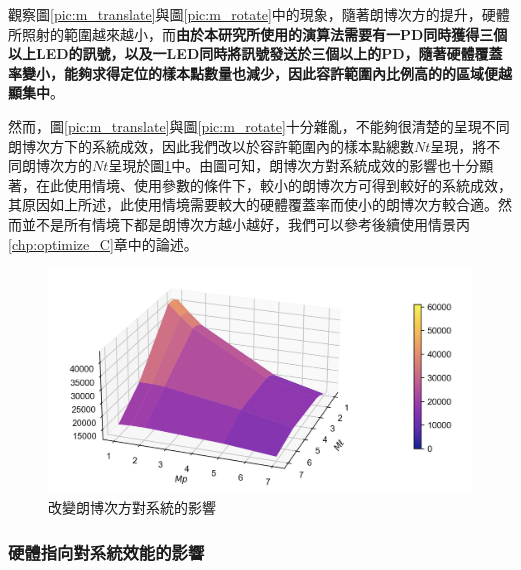 觀察圖\ref{pic:m_translate}與圖\ref{pic:m_rotate}中的現象，隨著朗博次方的提升，硬體所照射的範圍越來越小，而\textbf{由於本研究所使用的演算法需要有一PD同時獲得三個以上LED的訊號，以及一LED同時將訊號發送於三個以上的PD，隨著硬體覆蓋率變小，能夠求得定位的樣本點數量也減少，因此容許範圍內比例高的的區域便越顯集中}。



然而，圖\ref{pic:m_translate}與圖\ref{pic:m_rotate}十分雜亂，不能夠很清楚的呈現不同朗博次方下的系統成效，因此我們改以於容許範圍內的樣本點總數$Nt$呈現，將不同朗博次方的$Nt$呈現於圖\ref{pic:m alpha50 surface}中。由圖可知，朗博次方對系統成效的影響也十分顯著，在此使用情境、使用參數的條件下，較小的朗博次方可得到較好的系統成效，其原因如上所述，此使用情境需要較大的硬體覆蓋率而使小的朗博次方較合適。然而並不是所有情境下都是朗博次方越小越好，我們可以參考後續使用情景丙\ref{chp:optimize_C}章中的論述。

\begin{figure}[htpb]
    \centering
    \includegraphics[width=15cm]{ch4pic/m alpha50 surface.png}
    \caption{改變朗博次方對系統的影響}
    \label{pic:m alpha50 surface}
\end{figure}










\subsubsection{硬體指向對系統效能的影響}
\label{chp:orient_effect}

